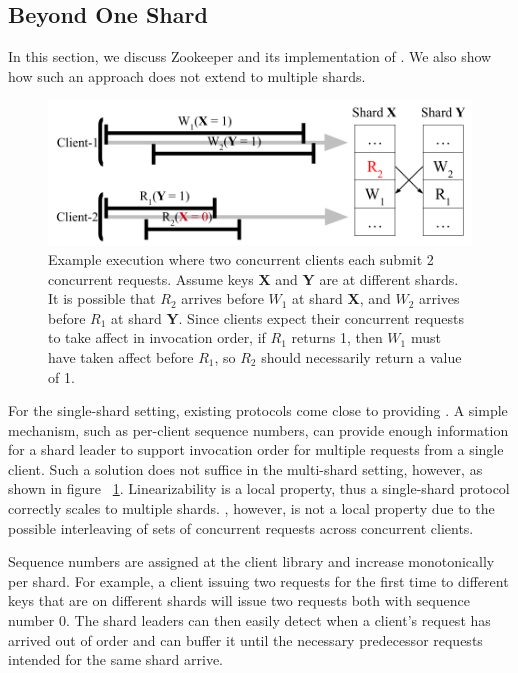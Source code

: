 \subsection{\MDL{} Beyond One Shard}
\label{sec:mdl:zookeeper}

In this section, we discuss Zookeeper and its implementation of \SDL{}.
We also show how such an approach does not extend to multiple shards.

\begin{figure}[!htb]
    \includegraphics[scale=.45]{figs/somet.png}
    \caption{Example execution where two concurrent clients each submit 2 concurrent requests. Assume keys \textbf{X} and \textbf{Y} are at different shards. It is possible that $R_2$ arrives before $W_1$ at shard \textbf{X}, and $W_2$ arrives before $R_1$ at shard \textbf{Y}. Since clients expect their concurrent requests to take affect in invocation order, if $R_1$ returns 1, then $W_1$ must have taken affect before $R_1$, so $R_2$ should necessarily return a value of 1.}
    \label{fig:concurrentbatches}
\end{figure}

For the single-shard setting, existing protocols come close to providing \MDL{}. A simple mechanism, such as per-client sequence numbers, can provide enough information for a shard leader to support invocation order for multiple requests from a single client. Such a solution does not suffice in the multi-shard setting, however, as shown in figure ~\ref{fig:concurrentbatches}. Linearizability is a local property, thus a single-shard protocol correctly scales to multiple shards. \MDL{}, however, is not a local property due to the possible interleaving of sets of concurrent requests across concurrent clients.

Sequence numbers are assigned at the client library 
and increase monotonically per shard. For example, a client issuing two requests for the first time to different keys that are on different shards will issue two requests both with sequence number 0. The shard leaders can then easily detect when a client's request
has arrived out of order and can buffer it until the necessary predecessor requests intended for the same shard arrive.

